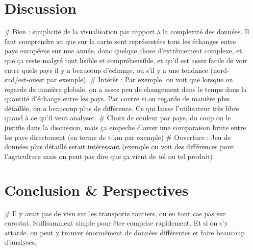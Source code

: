 \documentclass{vgtc}
\begin{document}
\section{Discussion}
# Bien : simplicité de la visualisation par rapport à la complexité des données. Il faut comprendre ici que sur la carte sont représentées tous les échanges entre pays européens sur une année, donc quelque chose d'extrêmement complexe, et que ça reste malgré tout lisible et compréhensible, et qu'il est assez facile de voir entre quels pays il y a beaucoup d'échange, ou s'il y a une tendance (nord-sud/est-ouest par exemple).
# Intérêt : Par exemple, on voit que lorsque on regarde de manière globale, on a assez peu de changement dans le temps dans la quantité d'échange entre les pays. Par contre si on regarde de manière plus détaillée, on a beaucoup plus de différence. Ce qui laisse l'utilisateur très libre quand à ce qu'il veut analyser.
# Choix de couleur par pays, du coup on le justifie dans la discussion, mais ça empeche d'avoir une comparaison brute entre les pays directement (en terme de t-km par exemple)
# Ouverture : Jeu de données plus détaillé serait intéressant (exemple on voit des différences pour l'agriculture mais on peut pas dire que ça vient de tel ou tel produit)

\section{Conclusion \& Perspectives}
# Il y avait pas de visu sur les transports routiers, ou en tout cas pas sur eurostat. Suffisamment simple pour être comprise rapidement. Et si on s'y attarde, on peut y trouver énormément de données différentes et faire beaucoup d'analyses.




\end{document}
